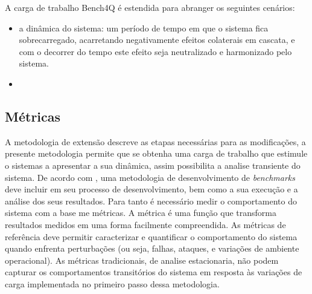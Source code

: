 A carga de trabalho Bench4Q é estendida para abranger os seguintes cenários:
\begin{itemize}
	\item a dinâmica do sistema: um período de tempo em que o sistema fica sobrecarregado, acarretando negativamente efeitos colaterais em cascata, e com o decorrer do tempo este efeito seja neutralizado e harmonizado pelo sistema. %
	\item %
\end{itemize}


\subsection{Métricas}
A metodologia de extensão descreve as etapas necessárias para as modificações, a presente metodologia permite que se obtenha uma carga de trabalho que estimule o sistemas a apresentar a sua dinâmica, assim possibilita a analise transiente do sistema. De acordo com \cite{KaiSachs2010}, uma metodologia de desenvolvimento de \textit{benchmarks} deve incluir em seu processo de desenvolvimento, bem como a sua execução e a análise dos seus resultados. Para tanto é necessário medir o comportamento do sistema com a base me métricas. A métrica é uma função que transforma resultados medidos em uma forma facilmente compreendida. \cite{Folkerts2013} As métricas de referência deve permitir caracterizar e quantificar o comportamento do sistema quando enfrenta perturbações (ou seja, falhas, ataques, e variações de ambiente operacional).\cite{Marco2012} As métricas tradicionais, de analise estacionaria, não podem capturar os comportamentos transitórios do sistema em resposta às variações de carga implementada no primeiro passo dessa metodologia.

